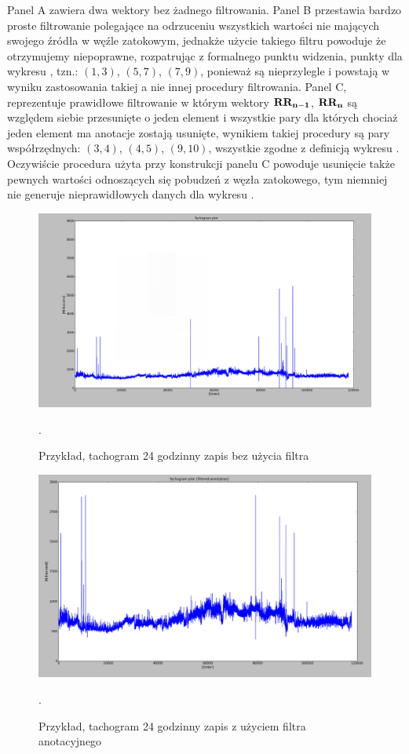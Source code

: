 Panel A zawiera dwa wektory bez żadnego filtrowania. Panel B przestawia bardzo proste
filtrowanie polegające na odrzuceniu wszystkich wartości nie mających swojego źródła w
węźle zatokowym, jednakże użycie takiego filtru powoduje że otrzymujemy niepoprawne,
rozpatrując z formalnego punktu widzenia, punkty dla wykresu \PP{}, tzn.:
$(1,3)$, $(5,7)$, $(7,9)$, ponieważ są nieprzylegle i powstają w wyniku zastosowania
takiej a nie innej procedury filtrowania. Panel C, reprezentuje
prawidłowe filtrowanie w którym wektory $\mathbf{RR_{n-1}}$, $\mathbf{RR_n}$ są względem siebie przesunięte
o jeden element i wszystkie pary dla których chociaż jeden element ma anotacje zostają
usunięte, wynikiem takiej procedury są pary współrzędnych:
$(3,4)$, $(4,5)$, $(9,10)$, wszystkie zgodne z definicją wykresu \PP{}. Oczywiście
procedura użyta przy konstrukcji panelu C powoduje usunięcie także pewnych wartości
odnoszących się pobudzeń z węzła zatokowego, tym niemniej nie generuje nieprawidłowych
danych dla wykresu \PP{}.

\begin{figure}
\centering
\includegraphics[scale=0.3]{graph/24h_tachogram_unfiltered.png}
\caption{Przykład, tachogram 24 godzinny zapis bez użycia filtra}.
\label{fig:24h_tachogram_unfiltered}
\end{figure}

\begin{figure}
\centering
\includegraphics[scale=0.3]{graph/24h_tachogram_annotated.png}
\caption{Przykład, tachogram 24 godzinny zapis z użyciem filtra anotacyjnego}.
\label{fig:24h_tachogram_annotated}
\end{figure}



